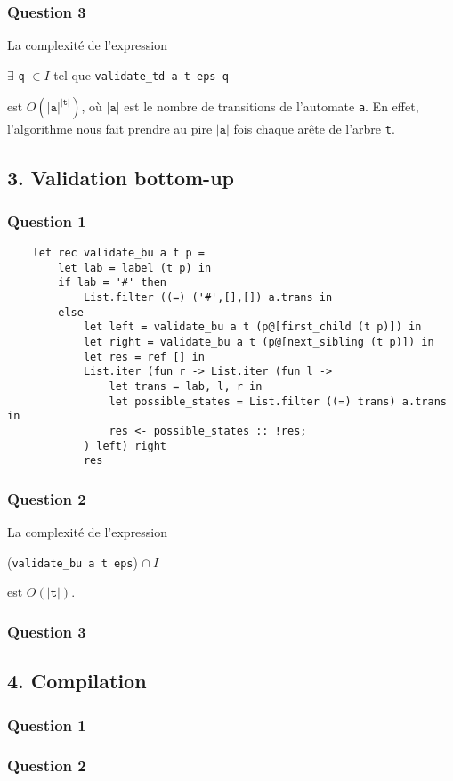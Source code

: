 \documentclass[a4paper,12pt]{article}
\newcommand{\ocaml}[1]{\texttt{#1}}
\begin{document}
\subsubsection*{Question 3}

La complexité de l'expression

\centerline{
$\exists$ \ocaml{q} $\in I$ tel que \ocaml{validate_td a t eps q}
}

est $O(|\ocaml{a}|^{|\ocaml{t}|})$, où $|\ocaml{a}|$ est le nombre de
transitions de l'automate \ocaml{a}. En effet, l'algorithme
nous fait prendre au pire $|\ocaml{a}|$ fois chaque arête de l'arbre \ocaml{t}.


\pagebreak
\subsection*{3. Validation bottom-up}
\subsubsection*{Question 1}

  \begin{verbatim}
    let rec validate_bu a t p =
        let lab = label (t p) in
        if lab = '#' then
            List.filter ((=) ('#',[],[]) a.trans in
        else
            let left = validate_bu a t (p@[first_child (t p)]) in
            let right = validate_bu a t (p@[next_sibling (t p)]) in
            let res = ref [] in
            List.iter (fun r -> List.iter (fun l ->
                let trans = lab, l, r in
                let possible_states = List.filter ((=) trans) a.trans in
                res <- possible_states :: !res;
            ) left) right
            res
   \end{verbatim}

\subsubsection*{Question 2}

La complexité de l'expression

\centerline{
    (\ocaml{validate_bu a t eps}) $\cap\ I$
}

est $O(|\ocaml{t}|)$.

\subsubsection*{Question 3}


\subsection*{4. Compilation}
\subsubsection*{Question 1}
\subsubsection*{Question 2}
\end{document}
